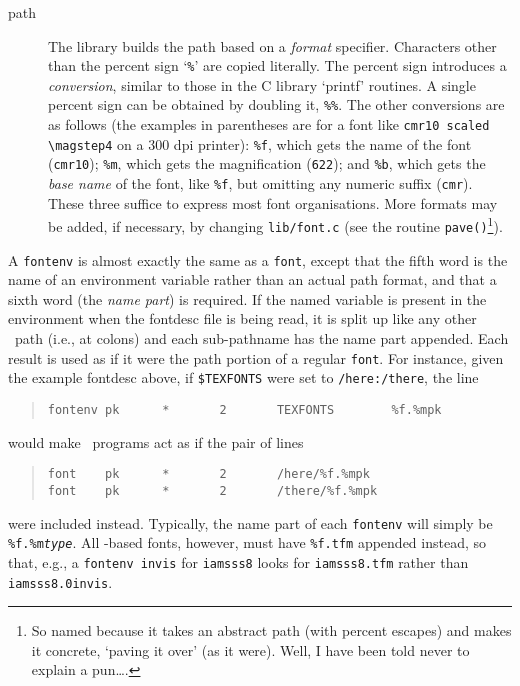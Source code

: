 \begin{description}
\item[path]
The library builds the path based on a {\em format\/} specifier.
Characters other than the percent sign `{\tt \%}' are copied literally.
The percent sign introduces a {\em conversion},
similar to those in the C library `printf' routines.
A single percent sign can be obtained by doubling it, {\tt \%\%}.
The other conversions are as follows (the examples in
parentheses are for a font like \verb|cmr10 scaled \magstep4|
on a 300 dpi printer):
{\tt \%f}, which gets the name of the font ({\tt cmr10});
{\tt \%m}, which gets the magnification ({\tt 622});
and {\tt \%b}, which gets the {\em base name\/} of the font,
like {\tt \%f}, but omitting any numeric suffix ({\tt cmr}).
These three suffice to express most font organisations.
More formats may be added, if necessary, by changing {\tt lib/font.c}
(see the routine {\tt pave()}\footnote
{So named because it takes an abstract path (with percent escapes)
and makes it concrete, `paving it over' (as it were).
Well, I have been told never to explain a pun\ldots.}).
\end{description}

A {\tt fontenv} is almost exactly the same as a {\tt font},
except that the fifth word is the name of an environment variable
rather than an actual path format,
and that a sixth word (the {\em name part\/}) is required.
If the named variable is present in the environment
when the fontdesc file is being read,
it is split up like any other \Unix\ path
(i.e., at colons)
and each sub-pathname has the name part appended.
Each result is used as if it were the path portion
of a regular {\tt font}.
For instance, given the example fontdesc above,
if {\tt \$TEXFONTS} were set to {\tt /here:/there},
the line
\begin{quote}
\begin{verbatim}
fontenv pk      *       2       TEXFONTS        %f.%mpk
\end{verbatim}
\end{quote}
would make \mctex\ programs act as if the pair of lines
\begin{quote}
\begin{verbatim}
font    pk      *       2       /here/%f.%mpk
font    pk      *       2       /there/%f.%mpk
\end{verbatim}
\end{quote}
were included instead.
Typically,
the name part of each {\tt fontenv} will simply be {\tt\%f.\%m\it type}.
All \tfm-based fonts, however,
must have {\tt\%f.tfm} appended instead,
so that, e.g., a {\tt fontenv invis} for {\tt iamsss8} looks for 
{\tt iamsss8.tfm} rather than {\tt iamsss8.0invis}.


